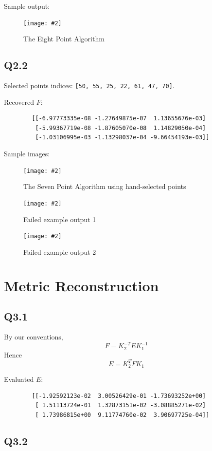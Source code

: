 \documentclass{article} %
\newcommand{\img}[3][0.3]{    
    \begin{figure}[h]
        \centering
        \texttt{[image: \#2]}
        \caption{#3}
    \end{figure}
}
\begin{document}
    Sample output:
    \img{q2,1_cropped.png}{The Eight Point Algorithm}

    \subsection*{Q2.2}
    Selected points indices: \verb|[50, 55, 25, 22, 61, 47, 70]|.

    Recovered $F$:
    \begin{verbatim}
        [[-6.97773335e-08 -1.27649875e-07  1.13655676e-03]
         [-5.99367719e-08 -1.87605070e-08  1.14829050e-04]
         [-1.03106995e-03 -1.13298037e-04 -9.66454193e-03]]
    \end{verbatim}

    Sample images:
    \img{q2,2_success.png}{The Seven Point Algorithm using hand-selected points}
    \img{q2,2_failed1.png}{Failed example output 1}
    \img{q2,2_failed3.png}{Failed example output 2}

    \section{Metric Reconstruction}
    \subsection*{Q3.1}
    By our conventions,
    \begin{equation*}
    F={K}_{2}^{-T}E{K}_{1}^{-1}
    \end{equation*}
    Hence
    \begin{equation*}
    E={K}_{2}^{T}FK_{1}
    \end{equation*}

    Evaluated $E$:
    \begin{verbatim}
        [[-1.92592123e-02  3.00526429e-01 -1.73693252e+00]
         [ 1.51113724e-01  1.32873151e-02 -3.08885271e-02]
         [ 1.73986815e+00  9.11774760e-02  3.90697725e-04]]
    \end{verbatim}

    \subsection*{Q3.2}
    
\end{document}
